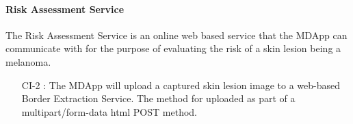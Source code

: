     \paragraph{Risk Assessment Service }

        The Risk Assessment Service is an online web based service that the MDApp can communicate with for the purpose of evaluating the risk of a skin lesion being a melanoma.

        \begin{itemize}[leftmargin=1.4cm]
            \item[CI-2 :] The MDApp will upload a captured skin lesion image to a web-based Border Extraction Service. The method for uploaded as part of a multipart/form-data html POST method.

        \end{itemize}